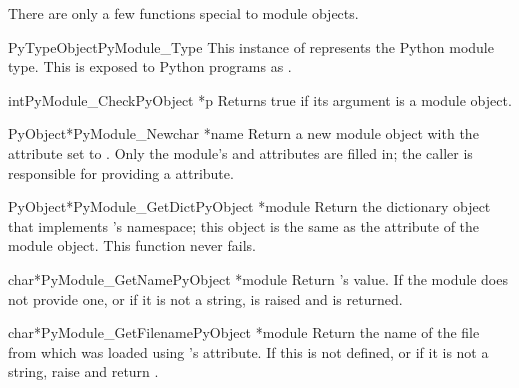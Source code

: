 \documentclass{manual}
\begin{document}
There are only a few functions special to module objects.

\begin{cvardesc}{PyTypeObject}{PyModule_Type}
This instance of  represents the Python module
type.  This is exposed to Python programs as .
\end{cvardesc}

\begin{cfuncdesc}{int}{PyModule_Check}{PyObject *p}
Returns true if its argument is a module object.
\end{cfuncdesc}

\begin{cfuncdesc}{PyObject*}{PyModule_New}{char *name}
Return a new module object with the  attribute set to
.  Only the module's  and
 attributes are filled in; the caller is responsible
for providing a  attribute.
\end{cfuncdesc}

\begin{cfuncdesc}{PyObject*}{PyModule_GetDict}{PyObject *module}
Return the dictionary object that implements 's namespace; 
this object is the same as the  attribute of the
module object.  This function never fails.
\end{cfuncdesc}

\begin{cfuncdesc}{char*}{PyModule_GetName}{PyObject *module}
Return 's  value.  If the module does not 
provide one, or if it is not a string,  is
raised and \NULL{} is returned.
\end{cfuncdesc}

\begin{cfuncdesc}{char*}{PyModule_GetFilename}{PyObject *module}
Return the name of the file from which  was loaded using
's  attribute.  If this is not defined,
or if it is not a string, raise  and return
\NULL.
\end{cfuncdesc}
\end{document}

